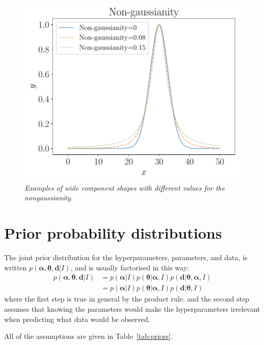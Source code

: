 \documentclass[a4paper, 12pt]{elsarticle}
\newcommand{\hypers}{\boldsymbol{\alpha}}
\newcommand{\params}{\boldsymbol{\theta}}
\newcommand{\data}{\boldsymbol{d}}
\newcommand{\info}{I}
\begin{document}
\begin{figure}[!ht]
\centering
\includegraphics[scale=0.7]{figures/nongaussianity.pdf}
\caption{\it Examples of wide component shapes with different values
for the nongaussianity.\label{fig:nongaussianity}}
\end{figure}

\section{Prior probability distributions}\label{sec:priors}
The joint prior distribution for the hyperparameters, parameters, and data,
is written $p(\hypers, \params, \data | \info)$, and is usually factorised
in this way:
\begin{align}
p(\hypers, \params, \data | \info) &=
    p(\hypers | \info)p(\params | \hypers, \info)
    p(\data | \params, \hypers, \info)\\
    &= p(\hypers | \info)p(\params | \hypers, \info)
    p(\data | \params, \info)
\end{align}
where the first step is true in general by the product rule, and the second
step assumes that knowing the parameters would make the hyperparameters
irrelevant when predicting what data would be observed.

All of the assumptions are given in Table~\ref{tab:priors}.
\end{document}
